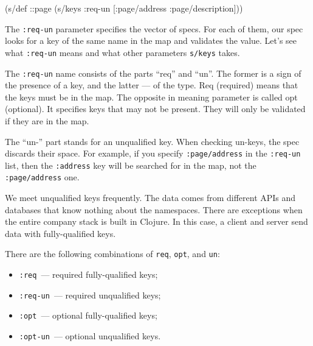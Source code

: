\begin{english}
  \begin{clojure}
(s/def ::page
  (s/keys :req-un [:page/address
                   :page/description]))
  \end{clojure}
\end{english}


The \verb|:req-un| parameter specifies the vector of specs. For each of them, our spec looks for a key of the same name in the map and validates the value. Let's see what \verb|:req-un| means and what other parameters \verb|s/keys| takes.

The \verb|:req-un| name consists of the parts ``req'' and ``un''. The former is a sign of the presence of a key, and the latter — of the type. Req (required) means that the keys must be in the map. The opposite in meaning parameter is called opt (optional). It specifies keys that may not be present. They will only be validated if they are in the map.


The ``un-'' part stands for an unqualified key. When checking un-keys, the spec discards their space. For example, if you specify \verb|:page/address| in the \verb|:req-un| list, then the \verb|:address| key will be searched for in the map, not the \verb|:page/address| one.

We meet unqualified keys frequently. The data comes from different APIs and databases that know nothing about the namespaces. There are exceptions when the entire company stack is built in Clojure. In this case, a client and server send data with fully-qualified keys.

There are the following combinations of  \verb|req|, \verb|opt|, and \verb|un|:

\begin{itemize}

\item
  \verb|:req|~--- required fully-qualified keys;

\item
  \verb|:req-un|~--- required unqualified keys;


\item
  \verb|:opt|~--- optional fully-qualified keys;


\item
  \verb|:opt-un|~--- optional unqualified keys.

\end{itemize}

